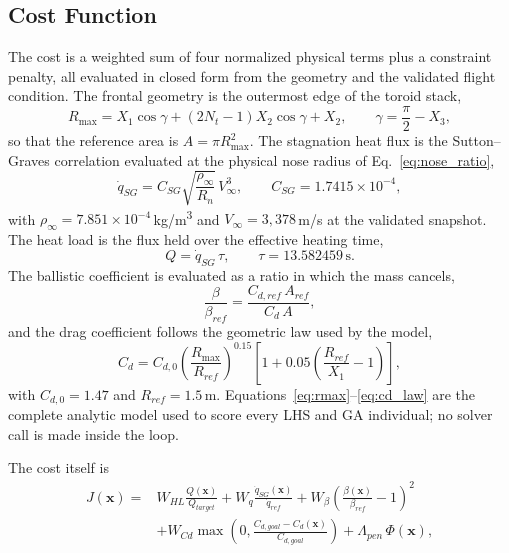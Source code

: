 \subsection{Cost Function}
The cost is a weighted sum of four normalized physical terms plus a constraint penalty, all evaluated in closed form from the geometry and the validated flight condition. The frontal geometry is the outermost edge of the toroid stack,
\begin{equation}
    R_{\max} = X_1\cos\gamma + (2N_t-1)X_2\cos\gamma + X_2,
    \qquad \gamma = \frac{\pi}{2} - X_3,
    \label{eq:rmax}
\end{equation}
so that the reference area is $A=\pi R_{\max}^2$. The stagnation heat flux is the Sutton--Graves correlation evaluated at the physical nose radius of Eq.~\eqref{eq:nose_ratio},
\begin{equation}
    \dot{q}_{SG} = C_{SG}\sqrt{\frac{\rho_\infty}{R_n}}\,V_\infty^3,
    \qquad C_{SG}=1.7415\times10^{-4},
    \label{eq:sutton_graves}
\end{equation}
with $\rho_\infty=7.851\times10^{-4}$\,kg/m\textsuperscript{3} and $V_\infty=3{,}378$\,m/s at the validated snapshot. The heat load is the flux held over the effective heating time,
\begin{equation}
    Q = \dot{q}_{SG}\,\tau, \qquad \tau = 13.582459\,\text{s}.
    \label{eq:heat_load}
\end{equation}
The ballistic coefficient is evaluated as a ratio in which the mass cancels,
\begin{equation}
    \frac{\beta}{\beta_{ref}} = \frac{C_{d,ref}\,A_{ref}}{C_d\,A},
    \label{eq:beta_ratio}
\end{equation}
and the drag coefficient follows the geometric law used by the model,
\begin{equation}
    C_d = C_{d,0}\left(\frac{R_{\max}}{R_{ref}}\right)^{0.15}
          \left[1+0.05\left(\frac{R_{ref}}{X_1}-1\right)\right],
    \label{eq:cd_law}
\end{equation}
with $C_{d,0}=1.47$ and $R_{ref}=1.5$\,m. Equations~\eqref{eq:rmax}--\eqref{eq:cd_law} are the complete analytic model used to score every LHS and GA individual; no solver call is made inside the loop.

The cost itself is
\begin{equation}
\begin{aligned}
    J(\mathbf{x}) = {} & W_{HL}\frac{Q(\mathbf{x})}{Q_{target}} + W_{q}\frac{\dot{q}_{SG}(\mathbf{x})}{\dot{q}_{ref}} + W_{\beta}\left(\frac{\beta(\mathbf{x})}{\beta_{ref}} - 1\right)^{2} \\
    & + W_{Cd}\max\!\left(0, \frac{C_{d,goal} - C_d(\mathbf{x})}{C_{d,goal}}\right) + \Lambda_{pen}\,\Phi(\mathbf{x}),
\end{aligned}
    \label{eq:ga_cost}
\end{equation}

